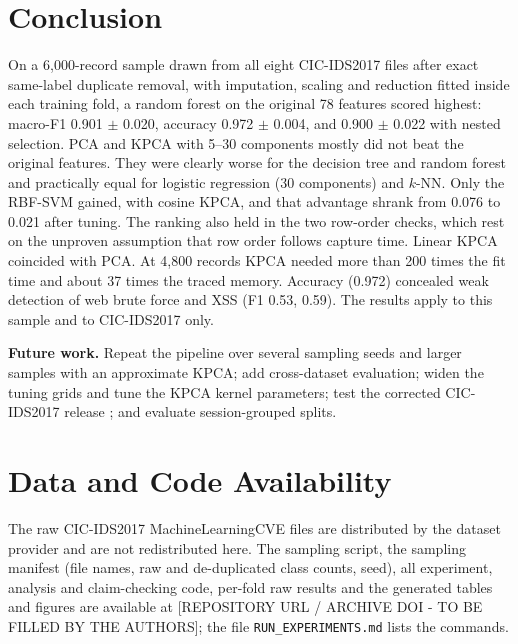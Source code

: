 \documentclass[runningheads]{llncs}
\begin{document}
\section{Conclusion}
On a 6{,}000-record sample drawn from all eight CIC-IDS2017 files after exact same-label duplicate removal, with imputation, scaling and reduction fitted inside each training fold, a random forest on the original 78 features scored highest: macro-F1 0.901 $\pm$ 0.020, accuracy 0.972 $\pm$ 0.004, and 0.900 $\pm$ 0.022 with nested selection. PCA and KPCA with 5--30 components mostly did not beat the original features. They were clearly worse for the decision tree and random forest and practically equal for logistic regression (30 components) and $k$-NN. Only the RBF-SVM gained, with cosine KPCA, and that advantage shrank from 0.076 to 0.021 after tuning. The ranking also held in the two row-order checks, which rest on the unproven assumption that row order follows capture time. Linear KPCA coincided with PCA. At 4{,}800 records KPCA needed more than 200 times the fit time and about 37 times the traced memory. Accuracy (0.972) concealed weak detection of web brute force and XSS (F1 0.53, 0.59). The results apply to this sample and to CIC-IDS2017 only.

\textbf{Future work.} Repeat the pipeline over several sampling seeds and larger samples with an approximate KPCA; add cross-dataset evaluation; widen the tuning grids and tune the KPCA kernel parameters; test the corrected CIC-IDS2017 release \cite{engelen2021}; and evaluate session-grouped splits.


\section*{Data and Code Availability}
The raw CIC-IDS2017 MachineLearningCVE files are distributed by the dataset provider \cite{sharafaldin2018} and are not redistributed here. The sampling script, the sampling manifest (file names, raw and de-duplicated class counts, seed), all experiment, analysis and claim-checking code, per-fold raw results and the generated tables and figures are available at [REPOSITORY URL / ARCHIVE DOI - TO BE FILLED BY THE AUTHORS]; the file \texttt{RUN\_EXPERIMENTS.md} lists the commands.
\end{document}
